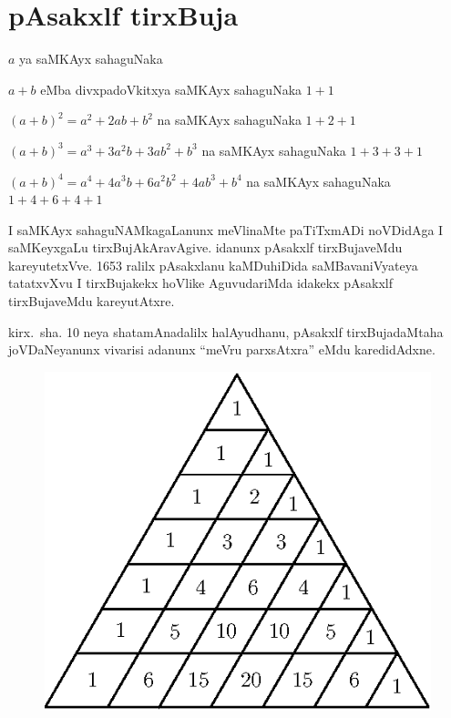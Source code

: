 \chapter{pAsakxlf tirxBuja}

\vskip -25pt
\noindent
$a$ ya saMKAyx sahaguNaka 
\vskip 2pt

\noindent
$a+b$ eMba divxpadoVkitxya saMKAyx sahaguNaka \quad $1+1$
\vskip 2pt

\noindent
$(a+b)^2=a^2+2ab+b^2$ na saMKAyx sahaguNaka \quad $1+2+1$
\vskip 2pt

\noindent
$(a+b)^3=a^3+3a^2b+3ab^2+b^3$ na saMKAyx sahaguNaka \quad $1+3+3+1$
\vskip 2pt

\noindent
$(a+b)^4=a^4+4a^3b+6a^2b^2+4ab^3+b^4$ na saMKAyx sahaguNaka \quad $1+4+6+4+1$
\vskip 2pt

I saMKAyx sahaguNAMkagaLanunx meVlinaMte paTiTxmADi noVDidAga I saMKeyxgaLu tirxBujAkAravAgive. idanunx pAsakxlf tirxBujaveMdu kareyutetxVve. {\rm 1653} ralilx pAsakxlanu kaMDuhiDida saMBavaniVyateya tatatxvXvu I tirxBujakekx hoVlike AguvudariMda idakekx pAsakxlf tirxBujaveMdu kareyutAtxre.

kirx.~sha. {\rm 10} neya shatamAnadalilx halAyudhanu, pAsakxlf tirxBujadaMtaha joVDaNe\-yanunx vivarisi adanunx ``meVru parxsAtxra'' eMdu karedidAdxne.
\hspace{2.5cm}
\begin{figure}[H]
\centering
\includegraphics[scale=.7]{src/figures/m_151.eps}
\end{figure}
\centerline{}

